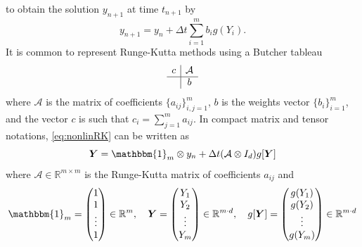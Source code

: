 \documentclass[10pt,a4paper]{article}
\newcommand{\R}{\mathbb{R}}
\def \calA{\mathcal{A}}
\renewcommand{\R}{\mathbb{R}}
\begin{document}
        to obtain the solution  $y_{n+1}$ at time $t_{n+1}$ by 
        \begin{equation} \label{eq:nonlinRKfinal}
            y_{n+1}= y_n + \Delta t \sum_{i=1}^m b_i g(Y_i).
        \end{equation}
        It is common to represent Runge-Kutta methods using a Butcher tableau
        \begin{equation}
            \begin{array}{c|c}
                 c&\calA\\
                 \hline
                 & b
            \end{array}
        \end{equation}
        where $\calA$ is the matrix of coefficients $\{a_{ij}\}_{i,j=1}^{m}$, $b$ is the weights vector $\{b_i\}_{i=1}^{m}$, and the vector $c$ is such that $c_i=\sum_{j=1}^{m} a_{ij}$.
        In compact matrix and tensor notations, \eqref{eq:nonlinRK} can be written as
\begin{equation}\label{eq:nonlinearimp}
	\boldsymbol{Y}
	=
	\mathbbm{1}_m \otimes y_n
	+
	\Delta t (\calA \otimes I_d)
	g[\boldsymbol{Y}]
	\end{equation}
where $\calA \in \R^{m\times m}$ is the Runge-Kutta matrix of coefficients $a_{ij}$ and 
\begin{equation} \label{eq:summary}
\mathbbm{1}_m = \begin{pmatrix}
	1\\
	1\\
	\vdots\\
	1\\
	\end{pmatrix}\in\R^m,\quad
\boldsymbol{Y}=\begin{pmatrix}
	Y_1\\
	Y_2\\
	\vdots\\
	Y_m\\
	\end{pmatrix}\in\R^{m \cdot d},\quad
 g[\boldsymbol{Y}] = \begin{pmatrix}
	g(Y_1)\\
	g(Y_2)\\
	\vdots\\
	g(Y_m)\\
	\end{pmatrix}\in\R^{m \cdot d}
 \end{equation}
\end{document}
